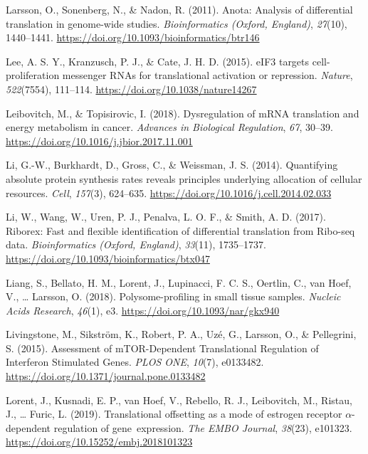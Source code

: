 \documentclass[12pt,openany]{book}
\begin{document}
\hypertarget{ref-Larsson2011}{}
Larsson, O., Sonenberg, N., \& Nadon, R. (2011). Anota: Analysis of
differential translation in genome-wide studies. \emph{Bioinformatics
(Oxford, England)}, \emph{27}(10), 1440--1441.
\url{https://doi.org/10.1093/bioinformatics/btr146}

\hypertarget{ref-Lee2015}{}
Lee, A. S. Y., Kranzusch, P. J., \& Cate, J. H. D. (2015). eIF3 targets
cell-proliferation messenger RNAs for translational activation or
repression. \emph{Nature}, \emph{522}(7554), 111--114.
\url{https://doi.org/10.1038/nature14267}

\hypertarget{ref-Leibovitch2018}{}
Leibovitch, M., \& Topisirovic, I. (2018). Dysregulation of mRNA
translation and energy metabolism in cancer. \emph{Advances in
Biological Regulation}, \emph{67}, 30--39.
\url{https://doi.org/10.1016/j.jbior.2017.11.001}

\hypertarget{ref-Li2014}{}
Li, G.-W., Burkhardt, D., Gross, C., \& Weissman, J. S. (2014).
Quantifying absolute protein synthesis rates reveals principles
underlying allocation of cellular resources. \emph{Cell}, \emph{157}(3),
624--635. \url{https://doi.org/10.1016/j.cell.2014.02.033}

\hypertarget{ref-Li2017}{}
Li, W., Wang, W., Uren, P. J., Penalva, L. O. F., \& Smith, A. D.
(2017). Riborex: Fast and flexible identification of differential
translation from Ribo-seq data. \emph{Bioinformatics (Oxford, England)},
\emph{33}(11), 1735--1737.
\url{https://doi.org/10.1093/bioinformatics/btx047}

\hypertarget{ref-Liang2018}{}
Liang, S., Bellato, H. M., Lorent, J., Lupinacci, F. C. S., Oertlin, C.,
van Hoef, V., \ldots{} Larsson, O. (2018). Polysome-profiling in small
tissue samples. \emph{Nucleic Acids Research}, \emph{46}(1), e3.
\url{https://doi.org/10.1093/nar/gkx940}

\hypertarget{ref-Livingstone2015}{}
Livingstone, M., Sikström, K., Robert, P. A., Uzé, G., Larsson, O., \&
Pellegrini, S. (2015). Assessment of mTOR-Dependent Translational
Regulation of Interferon Stimulated Genes. \emph{PLOS ONE},
\emph{10}(7), e0133482.
\url{https://doi.org/10.1371/journal.pone.0133482}

\hypertarget{ref-Lorent2019}{}
Lorent, J., Kusnadi, E. P., van Hoef, V., Rebello, R. J., Leibovitch,
M., Ristau, J., \ldots{} Furic, L. (2019). Translational offsetting as a
mode of estrogen receptor \(\alpha\)-dependent regulation of
gene~expression. \emph{The EMBO Journal}, \emph{38}(23), e101323.
\url{https://doi.org/10.15252/embj.2018101323}
\end{document}
